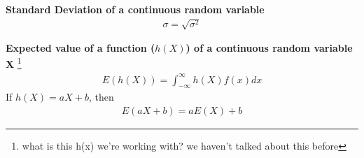 \documentclass[../INDE315.tex]{subfiles}
\begin{document}
\begin{defn}
    \textbf{Standard Deviation of a continuous random variable} \\ 
    \begin{equation*}
        \begin{aligned}
            \sigma = \sqrt{\sigma ^2 }
        \end{aligned}
    \end{equation*}    
\end{defn}

\begin{defn}
    \textbf{Expected value of a function ($h(X)$) of a continuous random variable X} \footnote{what is this h(x) we're working with? we haven't talked about this before}\\
    \begin{equation*}
        \begin{aligned}
            E(h(X)) = \int ^{\infty}_{-\infty} h(X) f(x) dx
        \end{aligned}
    \end{equation*}
    If $h(X) = aX + b$, then
    \begin{equation*}
        \begin{aligned}
             E(aX + b) = aE(X) + b
        \end{aligned}
    \end{equation*}
\end{defn}
\end{document}
